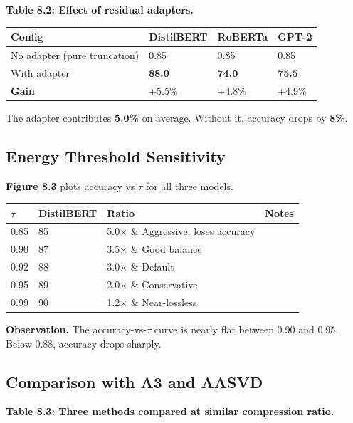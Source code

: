\textbf{Table 8.2: Effect of residual adapters.}

\begin{table}[H]
\centering
\small
\begin{tabular}{llll}
\toprule
\textbf{Config} & \textbf{DistilBERT} & \textbf{RoBERTa} & \textbf{GPT-2} \\
\midrule
No adapter (pure truncation) & 0.85 & 0.85 & 0.85 \\
With adapter & \textbf{88.0} & \textbf{74.0} & \textbf{75.5} \\
\textbf{Gain} & +5.5\% & +4.8\% & +4.9\% \\
\bottomrule
\end{tabular}
\end{table}

The adapter contributes \textbf{5.0\%} on average. Without it, accuracy 
drops by \textbf{8\%}.

\subsection{Energy Threshold Sensitivity}

\textbf{Figure 8.3} plots accuracy vs $\tau$ for all three models.

\begin{table}[H]
\centering
\small
\begin{tabular}{llll}
\toprule
\textbf{$\tau$} & \textbf{DistilBERT} & \textbf{Ratio} & \textbf{Notes} \\
\midrule
0.85 & 85 & 5.0$\times$ \& Aggressive, loses accuracy \\
0.90 & 87 & 3.5$\times$ \& Good balance \\
0.92 & 88 & 3.0$\times$ \& Default \\
0.95 & 89 & 2.0$\times$ \& Conservative \\
0.99 & 90 & 1.2$\times$ \& Near-lossless \\
\bottomrule
\end{tabular}
\end{table}

\textbf{Observation.} The accuracy-vs-$\tau$ curve is nearly flat between 0.90 
and 0.95. Below 0.88, accuracy drops sharply.

\subsection{Comparison with A3 and AASVD}

\textbf{Table 8.3: Three methods compared at similar compression ratio.}

